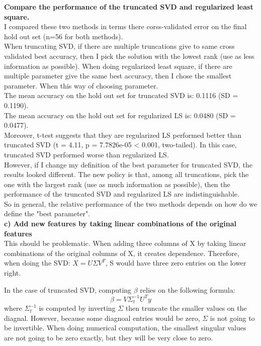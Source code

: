 \documentclass[paper=a4, fontsize=11pt]{scrartcl} %
\numberwithin{equation}{section} %
\numberwithin{figure}{section} %
\numberwithin{table}{section} %
\begin{document}
\textbf{Compare the performance of the truncated SVD and regularized least square. }\\

I compared these two methods in terms there corss-validated error on the final hold out set (n=56 for both methods). \\

When truncating SVD, if there are multiple truncations give to same cross validated best accuracy, then I pick the solution with the lowest rank (use as less information as possible). When doing regularized least square, if there are multiple parameter give the same best accuracy, then I chose the smallest parameter. When this way of choosing parameter. \\

The mean accuracy on the hold out set for truncated SVD is: 0.1116 (SD = 0.1190).\\
The mean accuracy on the hold out set for regularized LS is: 0.0480 (SD = 0.0477).\\
Moreover, t-test suggests that they are regularized LS performed better than truncated SVD (t = 4.11, p = 7.7826e-05 < 0.001, two-tailed). In this case, truncated SVD performed worse than regularized LS. \\

However, if I change my definition of the best parameter for truncated SVD, the results looked different. The new policy is that, among all truncations, pick the one with the largest rank (use as much information as possible), then the performance of the truncated SVD and regularized LS are indistinguishable. \\

So in general, the relative performance of the two methods depends on how do we define the "best parameter". \\


\textbf{c) Add new features by taking linear combinations of the original features}\\


This should be problematic. When adding three columns of X by taking linear combinations of the original columns of X, it creates dependence. Therefore, when doing the SVD: $X = U \Sigma V^T$, S would have three zero entries on the lower right. 

In the case of truncated SVD, computing $\beta$ relies on the following formula: 
$$\beta = V \Sigma_t^{-1} U^T y$$
where $\Sigma_t^{-1}$ is computed by inverting $\Sigma$ then truncate the smaller values on the diagnal. However, because some diagnoal entries would be zero, $\Sigma$ is not going to be invertible. When doing numerical computation, the smallest singular values are not going to be zero exactly, but they will be very close to zero. \\
\end{document}
